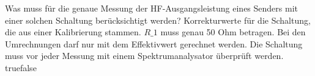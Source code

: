     {Was muss für die genaue Messung der HF-Ausgangsleistung eines Senders mit einer solchen Schaltung berücksichtigt werden?}
    {Korrekturwerte für die Schaltung, die aus einer Kalibrierung stammen.}
    {$R\_1$ muss genau 50 Ohm betragen.}
    {Bei den Umrechnungen darf nur mit dem Effektivwert gerechnet werden.}
    {Die Schaltung muss vor jeder Messung mit einem Spektrumanalysator überprüft werden.}
    {true}{false}